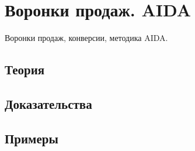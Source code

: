 
\section{Воронки продаж. AIDA}
\label{sec:2.6.04-sales-funnels-aida}

\begin{ticket}
Воронки продаж, конверсии, методика AIDA.
\end{ticket}

\subsection*{Теория}

\subsection*{Доказательства}

\subsection*{Примеры}
